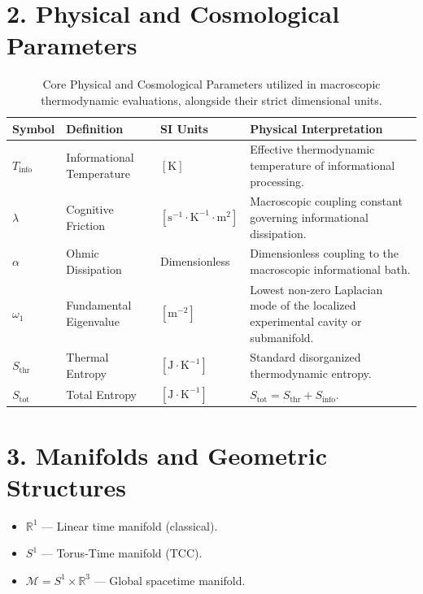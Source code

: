 \documentclass[12pt,openany]{book}
\theoremstyle{plain}
\theoremstyle{definition}
\theoremstyle{remark}
\begin{document}
\section*{2. Physical and Cosmological Parameters}

\begin{table}[H]
    \centering
    \caption{Core Physical and Cosmological Parameters utilized in macroscopic thermodynamic evaluations, alongside their strict dimensional units.}
    \label{tab:physical_parameters}
    \renewcommand{\arraystretch}{1.5}
    \begin{tabular}{|l|p{4.5cm}|l|p{5.5cm}|}
        \hline
        \textbf{Symbol} & \textbf{Definition} & \textbf{SI Units} & \textbf{Physical Interpretation} \\ \hline
        $T_{\text{info}}$ & Informational Temperature & $[\text{K}]$ & Effective thermodynamic temperature of informational processing. \\ \hline
        $\lambda$ & Cognitive Friction & $[\text{s}^{-1} \cdot \text{K}^{-1} \cdot \text{m}^2]$ & Macroscopic coupling constant governing informational dissipation. \\ \hline
        $\alpha$ & Ohmic Dissipation & Dimensionless & Dimensionless coupling to the macroscopic informational bath. \\ \hline
        $\omega_1$ & Fundamental Eigenvalue & $[\text{m}^{-2}]$ & Lowest non-zero Laplacian mode of the localized experimental cavity or submanifold. \\ \hline
        $S_{\text{thr}}$ & Thermal Entropy & $[\text{J} \cdot \text{K}^{-1}]$ & Standard disorganized thermodynamic entropy. \\ \hline
        $S_{\text{tot}}$ & Total Entropy & $[\text{J} \cdot \text{K}^{-1}]$ & $S_{\text{tot}} = S_{\text{thr}} + S_{\text{info}}$. \\ \hline
    \end{tabular}
\end{table}

\section*{3. Manifolds and Geometric Structures}

\begin{itemize}
    \item $\mathbb{R}^1$ — Linear time manifold (classical).  
    \item $S^1$ — Torus-Time manifold (TCC).  
    \item $\mathcal{M} = S^1 \times \mathbb{R}^3$ — Global spacetime manifold.  
\end{itemize}
\end{document}
